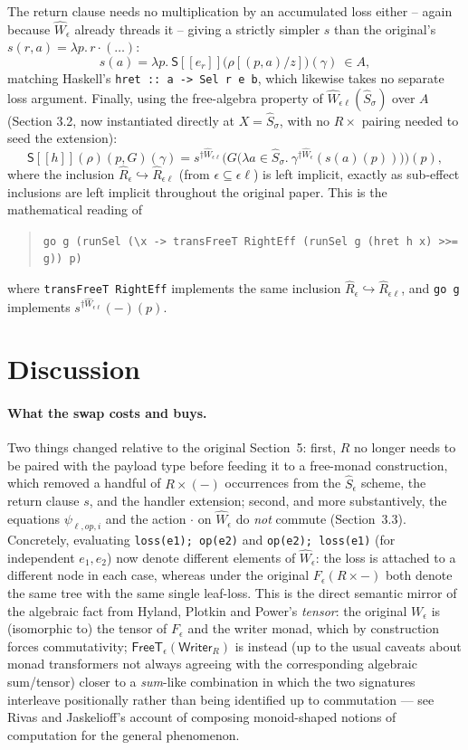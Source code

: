 \documentclass[11pt]{article}
\theoremstyle{plain}
\newcommand{\Ssem}[1]{\mathsf{S}[\![#1]\!]}
\newcommand{\Rm}[1]{\widehat{R}_{#1}}
\newcommand{\Sm}[1]{\widehat{S}_{#1}}
\newcommand{\eps}{\epsilon}
\newcommand{\dg}[1]{^{\dagger #1}}
\newcommand{\op}{\mathit{op}}
\begin{document}
The return clause needs no multiplication by an accumulated loss either -- again because
$\widehat W_\eps$ already threads it -- giving a strictly simpler $s$ than the original's
$s(r,a)=\lambda p.\,r\cdot(\dots)$:
\[
  s(a) = \lambda p.\ \Ssem{e_r}\big(\rho[(p,a)/z]\big)(\gamma) \ \in A,
\]
matching Haskell's \texttt{hret :: a -> Sel r e b}, which likewise takes no separate loss
argument. Finally, using the free-algebra property of $\widehat W_{\eps\ell}(\Sm\sigma)$ over
$A$ (Section 3.2, now instantiated directly at $X = \Sm\sigma$, with no $R\times$ pairing
needed to seed the extension):
\[
  \Ssem{h}(\rho)(p,G)(\gamma) = s\dg{\widehat W_{\eps\ell}}\Big(G\big(\lambda a\in\Sm\sigma.\
    \gamma\dg{\widehat W_\eps}(s(a)(p))\big)\Big)(p),
\]
where the inclusion $\Rm\eps\hookrightarrow\Rm{\eps\ell}$ (from $\eps\subseteq\eps\ell$) is
left implicit, exactly as sub-effect inclusions are left implicit throughout the original
paper. This is the mathematical reading of
\begin{quote}
\texttt{go g (runSel (\textbackslash x -> transFreeT RightEff (runSel g (hret h x) >>= g)) p)}
\end{quote}
where \texttt{transFreeT RightEff} implements the same inclusion $\Rm\eps\hookrightarrow
\Rm{\eps\ell}$, and \texttt{go g} implements $s\dg{\widehat W_{\eps\ell}}(-)(p)$.

\section{Discussion}

\paragraph{What the swap costs and buys.} Two things changed relative to the original
Section~5: first, $R$ no longer needs to be paired with the payload type before feeding it to
a free-monad construction, which removed a handful of $R\times(-)$ occurrences from the
$\widehat S_\eps$ scheme, the return clause $s$, and the handler extension; second, and more
substantively, the equations $\psi_{\ell,\op,i}$ and the action $\cdot$ on $\widehat W_\eps$ do
\emph{not} commute (Section~3.3). Concretely, evaluating \texttt{loss(e1); op(e2)} and
\texttt{op(e2); loss(e1)} (for independent $e_1,e_2$) now denote different elements of
$\widehat W_\eps$: the loss is attached to a different node in each case, whereas under the
original $F_\eps(R\times-)$ both denote the same tree with the same single leaf-loss. This is
the direct semantic mirror of the algebraic fact from Hyland, Plotkin and Power's
\emph{tensor}: the original $W_\eps$ is (isomorphic to) the tensor of $F_\eps$ and the writer
monad, which by construction forces commutativity; $\mathsf{FreeT}_\eps(\mathsf{Writer}_R)$ is
instead (up to the usual caveats about monad transformers not always agreeing with the
corresponding algebraic sum/tensor) closer to a \emph{sum}-like combination in which the two
signatures interleave positionally rather than being identified up to commutation --- see
Rivas and Jaskelioff's account of composing monoid-shaped notions of computation for the
general phenomenon.
\end{document}
